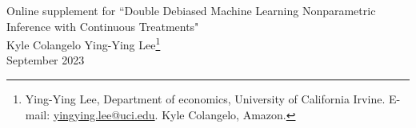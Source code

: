 \documentclass[lettersize, 12pt]{article}
\renewcommand{\thesection}{\arabic{section}}
\renewcommand{\theequation}{\arabic{section}.\arabic{equation}}
\renewcommand{\thetheorem}{\arabic{section}.\arabic{theorem}}
\renewcommand{\theassumption}{\arabic{section}.\arabic{assumption}}
\renewcommand{\theremark}{\arabic{section}.\arabic{remark}}
\newcounter{bean}
\newcounter{beana}
\newcounter{beanb}
\def\changemargin#1#2{\list{}{\rightmargin#2\leftmargin#1}\item[]}
\let\endchangemargin=\endlist
\begin{document}
{\newpage

\renewcommand{\theequation}{S.\arabic{equation}}
\renewcommand{\thesection}{S\arabic{section}}
\renewcommand{\thepage}{S\arabic{page}}

\renewcommand{\thetheorem}{S\arabic{theorem}}
\renewcommand{\theassumption}{S\arabic{assumption}}
\renewcommand{\theremark}{S\arabic{remark}}
\renewcommand{\thetable}{S\arabic{table}}
\renewcommand{\thefigure}{S\arabic{figure}}

\setcounter{equation}{0}
\setcounter{page}{1}
\setcounter{section}{0}





%




\begin{center}
{\Large 
Online supplement for  ``Double Debiased Machine Learning Nonparametric Inference with Continuous Treatments"
\\[10pt]
\large Kyle Colangelo 
\hspace{0.6cm} 
Ying-Ying Lee\footnote{Ying-Ying Lee, Department of economics, University of California Irvine.
E-mail: \href{yingying.lee@uci.edu}{yingying.lee@uci.edu}.
Kyle Colangelo, Amazon.
}
\\[5pt]
\normalsize September 2023
} 
\maketitle


\end{center}}
\end{document}
